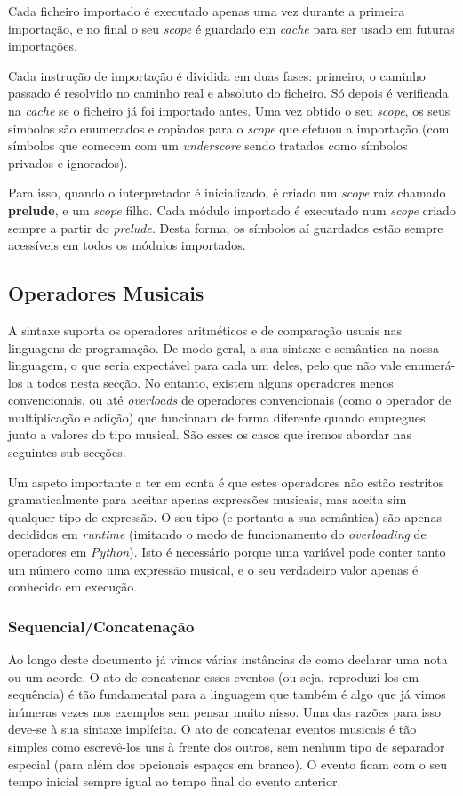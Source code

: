 Cada ficheiro importado é executado apenas uma vez durante a primeira importação, e no final o seu \textit{scope} é guardado em \textit{cache} para ser usado em futuras importações.

Cada instrução de importação é dividida em duas fases: primeiro, o caminho passado é resolvido no caminho real e absoluto do ficheiro. Só depois é verificada na \textit{cache} se o ficheiro já foi importado antes. Uma vez obtido o seu \textit{scope}, os seus símbolos são enumerados e copiados para o \textit{scope} que efetuou a importação (com símbolos que comecem com um \textit{underscore} sendo tratados como símbolos privados e ignorados).

Para isso, quando o interpretador é inicializado, é criado um \textit{scope} raiz chamado \textbf{prelude}, e um \textit{scope} filho. Cada módulo importado é executado num \textit{scope} criado sempre a partir do \textit{prelude}. Desta forma, os símbolos aí guardados estão sempre acessíveis em todos os módulos importados.


\subsection{Operadores Musicais}
A sintaxe suporta os operadores aritméticos e de comparação usuais nas linguagens de programação. De modo geral, a sua sintaxe e semântica na nossa linguagem, o que seria expectável para cada um deles, pelo que não vale enumerá-los a todos nesta secção. No entanto, existem alguns operadores menos convencionais, ou até \textit{overloads} de operadores convencionais (como o operador de multiplicação e adição) que funcionam de forma diferente quando empregues junto a valores do tipo musical. São esses os casos que iremos abordar nas seguintes sub-secções.

Um aspeto importante a ter em conta é que estes operadores não estão restritos gramaticalmente para aceitar apenas expressões musicais, mas aceita sim qualquer tipo de expressão. O seu tipo (e portanto a sua semântica) são apenas decididos em \textit{runtime} (imitando o modo de funcionamento do \textit{overloading} de operadores em \textit{Python}). Isto é necessário porque uma variável pode conter tanto um número como uma expressão musical, e o seu verdadeiro valor apenas é conhecido em execução.

\subsubsection{Sequencial/Concatenação}
Ao longo deste documento já vimos várias instâncias de como declarar uma nota ou um acorde. O ato de concatenar esses eventos (ou seja, reproduzi-los em sequência) é tão fundamental para a linguagem que também é algo que já vimos inúmeras vezes nos exemplos sem pensar muito nisso. Uma das razões para isso deve-se à sua sintaxe implícita. O ato de concatenar eventos musicais é tão simples como escrevê-los uns à frente dos outros, sem nenhum tipo de separador especial (para além dos opcionais espaços em branco). O evento ficam com o seu tempo inicial sempre igual ao tempo final do evento anterior.

